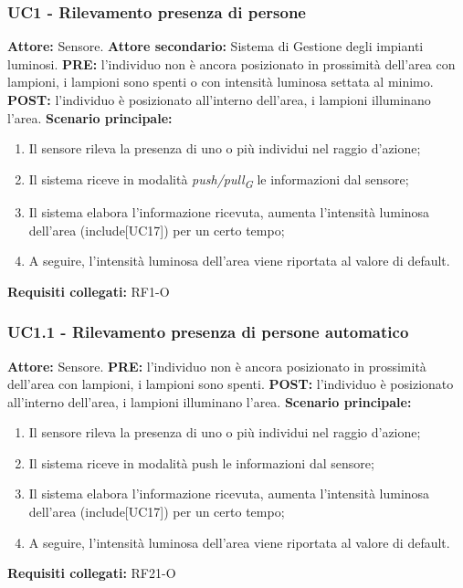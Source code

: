 \documentclass[a4paper, 12pt]{article}
\begin{document}
\subsubsection{UC1 - Rilevamento presenza di persone}
\textbf{Attore:} Sensore.\newline
\textbf{Attore secondario:} Sistema di Gestione degli impianti luminosi.\newline
\textbf{PRE:} l'individuo non è ancora posizionato in prossimità dell'area con lampioni, i lampioni sono spenti o con intensità luminosa settata al minimo.\newline
\textbf{POST:} l'individuo è posizionato all'interno dell'area, i lampioni illuminano l'area.\newline
\textbf{Scenario principale:}
\begin{enumerate}
    \item Il sensore rileva la presenza di uno o più individui nel raggio d'azione;
    \item Il sistema riceve in modalità \textit{push/pull\textsubscript{G}} le informazioni dal sensore;
    \item Il sistema elabora l'informazione ricevuta, aumenta l'intensità luminosa dell'area (include[UC17]) per un certo tempo;
    \item A seguire, l'intensità luminosa dell'area viene riportata al valore di default.
\end{enumerate}
\textbf{Requisiti collegati:} RF1-O\newline

\subsubsection{UC1.1 - Rilevamento presenza di persone automatico}
\textbf{Attore:} Sensore.\newline
\textbf{PRE:} l'individuo non è ancora posizionato in prossimità dell'area con lampioni, i lampioni sono spenti.\newline
\textbf{POST:} l'individuo è posizionato all'interno dell'area, i lampioni illuminano l'area.\newline
\textbf{Scenario principale:}
\begin{enumerate}
    \item Il sensore rileva la presenza di uno o più individui nel raggio d'azione;
    \item Il sistema riceve in modalità push le informazioni dal sensore;
    \item Il sistema elabora l'informazione ricevuta, aumenta l'intensità luminosa dell'area (include[UC17]) per un certo tempo;
    \item A seguire, l'intensità luminosa dell'area viene riportata al valore di default.
\end{enumerate}
\textbf{Requisiti collegati:} RF21-O\newline
\end{document}
